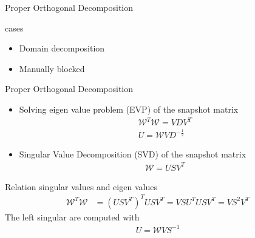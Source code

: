 \begin{frame}{Proper Orthogonal Decomposition}
	\Large{}
	\normalsize

	\begin{minipage}[t]{0.3\textwidth}
		\scalebox{0.75}{
			
		}
	\end{minipage}
	\hfill
	\begin{minipage}[t]{0.4\textwidth}\vspace{-60mm}
	 cases
	\begin{itemize}
		\item Domain decomposition
		\item Manually blocked
	\end{itemize}
	\end{minipage}
\end{frame}
\begin{frame}{Proper Orthogonal Decomposition}

	\begin{minipage}[t]{0.48\linewidth}
		\Large{}
		\normalsize
		
		\begin{itemize}
			\item Solving eigen value problem (EVP) of the snapshot matrix
			\begin{align*}
				\mathcal{W}^T \mathcal{W} = V D V^T\\
				U = \mathcal{W}VD^{-\frac{1}{2}}
			\end{align*}
		\end{itemize}
	\end{minipage}
	\hfill%
	\begin{minipage}[t]{0.48\linewidth}
		\Large{}
		\normalsize
		
		\begin{itemize}
			\item Singular Value Decomposition (SVD) of the snapshot matrix
			\begin{align*}
				\mathcal{W} = USV^T
			\end{align*}
		\end{itemize}	 
	\end{minipage}
	
	\vspace{10mm}
  	
	Relation singular values and eigen values
	\begin{align*}   
		\mathcal{W}^T \mathcal{W} &= (USV^T)^T USV^T = VSU^T USV^T = V S^2 V^T
	\end{align*}
	The left singular are computed with 
	\begin{align*}
		U = \mathcal{W}VS^{-1}
	\end{align*}


	
\end{frame}


